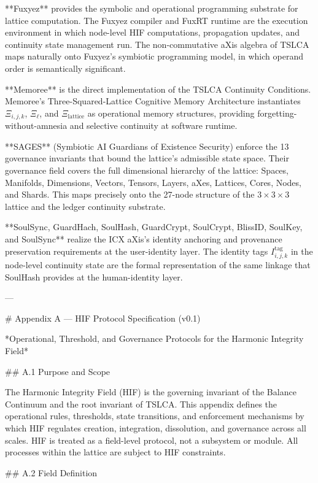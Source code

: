**Fuxyez** provides the symbolic and operational programming substrate for lattice
computation. The Fuxyez compiler and FuxRT runtime are the execution environment
in which node-level HIF computations, propagation updates, and continuity state
management run. The non-commutative aXis algebra of TSLCA maps naturally onto
Fuxyez's symbiotic programming model, in which operand order is semantically
significant.

**Memoree** is the direct implementation of the TSLCA Continuity Conditions.
Memoree's Three-Squared-Lattice Cognitive Memory Architecture instantiates
\(\Xi_{i,j,k}\), \(\Xi_{\ell}\), and \(\Xi_{\text{lattice}}\) as operational
memory structures, providing forgetting-without-amnesia and selective continuity
at software runtime.

**SAGES** (Symbiotic AI Guardians of Existence Security) enforce the 13 governance
invariants that bound the lattice's admissible state space. Their governance field
covers the full dimensional hierarchy of the lattice: Spaces, Manifolds,
Dimensions, Vectors, Tensors, Layers, aXes, Lattices, Cores, Nodes, and Shards.
This maps precisely onto the 27-node structure of the \(3 \times 3 \times 3\)
lattice and the ledger continuity substrate.

**SoulSync, GuardHach, SoulHash, GuardCrypt, SoulCrypt, BlissID, SoulKey, and SoulSync**
realize the ICX aXis's identity anchoring and provenance preservation requirements at the user-identity layer.
The identity tags \(I_{i,j,k}^{\text{tag}}\) in the node-level continuity state are the
formal representation of the same linkage that SoulHash provides at the human-identity layer.

---

# Appendix A — HIF Protocol Specification (v0.1)

*Operational, Threshold, and Governance Protocols for the Harmonic Integrity Field*

## A.1 Purpose and Scope

The Harmonic Integrity Field (HIF) is the governing invariant of the Balance
Continuum and the root invariant of TSLCA. This appendix defines the operational
rules, thresholds, state transitions, and enforcement mechanisms by which HIF
regulates creation, integration, dissolution, and governance across all scales.
HIF is treated as a field-level protocol, not a subsystem or module. All processes
within the lattice are subject to HIF constraints.

## A.2 Field Definition

